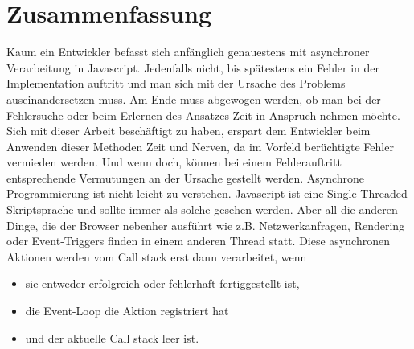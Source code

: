 \section{Zusammenfassung}

Kaum ein Entwickler befasst sich anfänglich genauestens mit asynchroner Verarbeitung in Javascript. Jedenfalls nicht, bis spätestens ein Fehler in der Implementation auftritt und man sich mit der Ursache des Problems auseinandersetzen muss. Am Ende muss abgewogen werden, ob man bei der Fehlersuche oder beim Erlernen des Ansatzes Zeit in Anspruch nehmen möchte. Sich mit dieser Arbeit beschäftigt zu haben, erspart dem Entwickler beim Anwenden dieser Methoden Zeit und Nerven, da im Vorfeld berüchtigte Fehler vermieden werden. Und wenn doch, können bei einem Fehlerauftritt entsprechende Vermutungen an der Ursache gestellt werden. Asynchrone Programmierung ist nicht leicht zu verstehen. Javascript ist eine Single-Threaded Skriptsprache und sollte immer als solche gesehen werden. Aber all die anderen Dinge, die der Browser nebenher ausführt wie z.B. Netzwerkanfragen, Rendering oder Event-Triggers finden in einem anderen Thread statt. Diese asynchronen Aktionen werden vom Call stack erst dann verarbeitet, wenn 

\begin{itemize}
\item sie entweder erfolgreich oder fehlerhaft fertiggestellt ist,
\item die Event-Loop die Aktion registriert hat
\item und der aktuelle Call stack leer ist.
\end{itemize}

